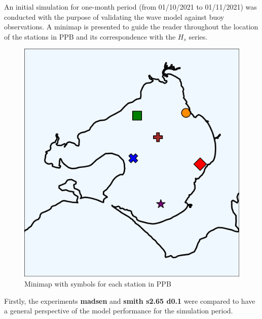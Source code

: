 \documentclass[12pt]{article}
\begin{document}
An initial simulation for one-month period (from 01/10/2021 to 01/11/2021) was conducted with the purpose of validating the wave model against buoy observations. A minimap is presented to guide the reader throughout the location of the stations in PPB and its correspondence with the $H_s$ series. 

\begin{figure}[h]
    \centering
    \includegraphics[scale=0.35]{plots/maps/coastline_miniature.png}
    \caption{Minimap with symbols for each station in PPB}
    \label{fig:minimap}
\end{figure}

Firstly, the experiments \textbf{madsen} and \textbf{smith s2.65 d0.1} were compared to have a general perspective of the model performance for the simulation period.
\end{document}

